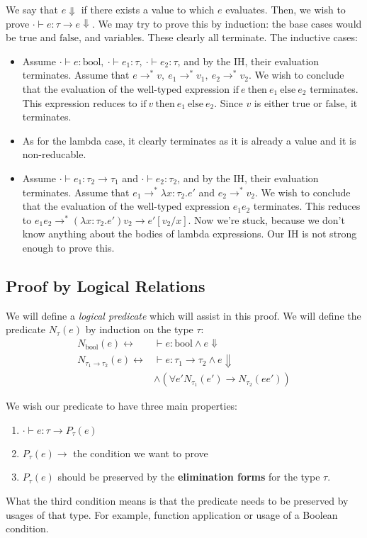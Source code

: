 We say that $e \Downarrow$ if there exists a value to which $e$ evaluates. Then, we wish to prove $\cdot \vdash e : \tau \to e \Downarrow$.
We may try to prove this by induction: the base cases would be $\mathrm{true}$ and $\mathrm{false}$, and variables. These clearly all
terminate. The inductive cases:
\begin{itemize}
\item Assume $\cdot \vdash e : \mathrm{bool},~\cdot\vdash e_1 : \tau,~\cdot\vdash e_2 : \tau$, and by the IH, their evaluation 
terminates. Assume that $e \to^* v,~e_1\to^* v_1,~e_2 \to^* v_2$. We wish to conclude that the evaluation of the well-typed expression
$\mathrm{if}~e~\mathrm{then}~e_1~\mathrm{else}~e_2$ terminates. This expression reduces to $\mathrm{if}~v~\mathrm{then}~e_1~\mathrm{else}~e_2$.
Since $v$ is either $\mathrm{true}$ or $\mathrm{false}$, it terminates.
\item As for the lambda case, it clearly terminates as it is already a value and it is non-reducable.
\item Assume $\cdot \vdash e_1 : \tau_2 \to \tau_1$ and $\cdot \vdash e_2 : \tau_2$, and by the IH, their evaluation
terminates. Assume that $e_1 \to^* \lambda x: \tau_2. e'$ and $e_2 \to^* v_2$. We wish to conclude that the evaluation of the
well-typed expression $e_1 e_2$ terminates. This reduces to $e_1 e_2 \to^* (\lambda x: \tau_2. e') v_2 \to e'[v_2/x]$. 
Now we're stuck, because we don't know anything about the bodies of lambda expressions. Our IH is not strong enough to prove this.
\end{itemize}

\subsection{Proof by Logical Relations}
We will define a \emph{logical predicate} which will assist in this proof. We will define the predicate $N_\tau(e)$
by induction on the type $\tau$:
\[
\begin{array}{rl}
N_\mathrm{bool}(e)\leftrightarrow& \vdash e: \mathrm{bool} \wedge e \Downarrow \\
N_{\tau_1 \to \tau_2}(e)\leftrightarrow& \vdash e: \tau_1 \to \tau_2 \wedge e \Downarrow\\
& \wedge (\forall e' N_{\tau_1}(e') \to N_{\tau_2} (e e'))
\end{array}
\]

We wish our predicate to have three main properties:
\begin{enumerate}
\item $\cdot \vdash e: \tau \to P_\tau(e)$
\item $P_\tau(e) \to$ the condition we want to prove
\item $P_\tau(e)$ should be preserved by the \textbf{elimination forms} for the type $\tau$.
\end{enumerate}
What the third condition means is that the predicate needs to be preserved by usages of that type. 
For example, function application or usage of a Boolean condition.


